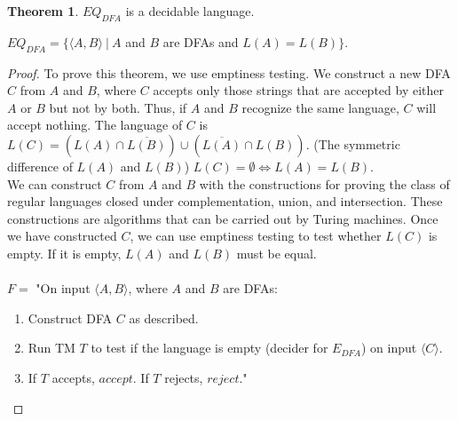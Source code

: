 \documentclass[11pt]{article}
\theoremstyle{definition}
\newtheorem{thm}{Theorem}[section]
\begin{document}
\begin{thm}
    $EQ_{DFA}$ is a decidable language.
    \begin{center}
        $EQ_{DFA} =\{\langle A, B\rangle\ |\ A$ and $B$ are DFAs and $L(A)=L(B)\}$.
    \end{center}
\end{thm}
\begin{proof}
    To prove this theorem, we use emptiness testing. We construct a new DFA $C$ from $A$ and $B$, where $C$ accepts only those strings that are accepted by either $A$ or $B$ but not by both. Thus, if $A$ and $B$ recognize the same language, $C$ will accept nothing. The language of $C$ is $L(C) =  (L(A) \cap \overline{L(B)})  \cup  (\overline{L(A)} \cap L(B))$. (The symmetric difference of $L(A)$ and $L(B)$) $L(C) = \emptyset \iff L(A) = L(B)$.\\
    We can construct $C$ from $A$ and $B$ with the constructions for proving the class of regular languages closed under complementation, union, and intersection. These constructions are algorithms that can be carried out by Turing machines. Once we have constructed $C$, we can use emptiness testing to test whether $L(C)$ is empty. If it is empty, $L(A)$ and $L(B)$ must be equal.\\\\
    $F =$ "On input $\langle A, B\rangle$, where $A$ and $B$ are DFAs:
    \begin{enumerate}
        \item Construct DFA $C$ as described.
        \item Run TM $T$ to test if the language is empty (decider for $E_{DFA}$) on input $\langle C\rangle$.
        \item If $T$ accepts, $accept$. If $T$ rejects, $reject$."
    \end{enumerate}
\end{proof}
\end{document}
